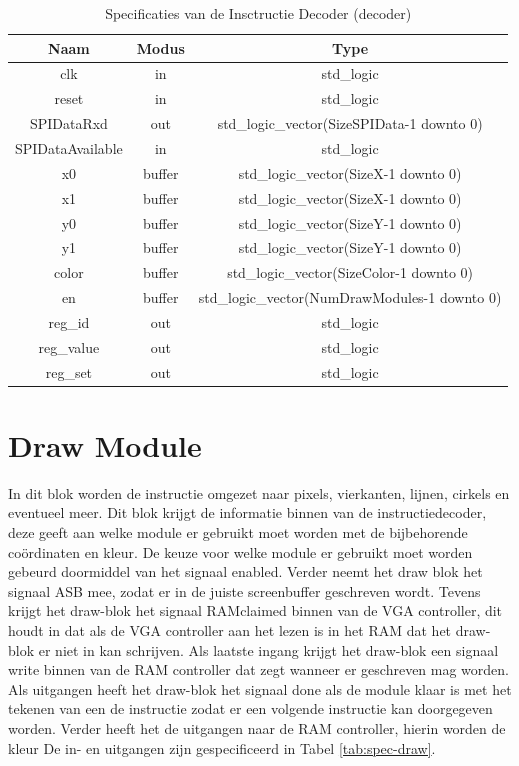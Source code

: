 \documentclass{scrreprt} %
\begin{document}
\begin{table}[H]
\centering
\caption{Specificaties van de Insctructie Decoder (decoder)}
\label{tab:spec-decoder}
\begin{tabular}{c c c}
	\hline\hline
 	Naam & Modus & Type\\
 	\hline
	clk & in & std\_logic \\
	reset & in & std\_logic \\	
	SPIDataRxd & out & std\_logic\_vector(SizeSPIData-1 downto 0) \\
	SPIDataAvailable & in & std\_logic \\
	x0 &  buffer & std\_logic\_vector(SizeX-1 downto 0) \\
	x1 &  buffer & std\_logic\_vector(SizeX-1 downto 0) \\
	y0 &  buffer & std\_logic\_vector(SizeY-1 downto 0) \\
	y1 &  buffer & std\_logic\_vector(SizeY-1 downto 0) \\
	color &  buffer & std\_logic\_vector(SizeColor-1 downto 0) \\
	en & buffer & std\_logic\_vector(NumDrawModules-1 downto 0)\\
	reg\_id & out & std\_logic \\
	reg\_value & out & std\_logic \\
	reg\_set & out & std\_logic \\
  	\hline
\end{tabular}
\end{table}

\section{Draw Module}
In dit blok worden de instructie omgezet naar pixels, vierkanten, lijnen, cirkels en eventueel meer. Dit blok krijgt de informatie binnen van de instructiedecoder, deze geeft aan welke module er gebruikt moet worden met de bijbehorende coördinaten en kleur.
De keuze voor welke module er gebruikt moet worden gebeurd doormiddel van het signaal enabled. Verder neemt het draw blok het signaal ASB mee, zodat er in de juiste screenbuffer geschreven wordt.
Tevens krijgt het draw-blok het signaal RAMclaimed binnen van de VGA controller, dit houdt in dat als de VGA controller aan het lezen is in het RAM dat het draw-blok er niet in kan schrijven.
Als laatste ingang krijgt het draw-blok een signaal write binnen van de RAM controller dat zegt wanneer er geschreven mag worden.
Als uitgangen heeft het draw-blok het signaal done als de module klaar is met het tekenen van een de instructie zodat er een volgende instructie kan doorgegeven worden. Verder heeft het de uitgangen naar de RAM controller, hierin worden de kleur 
De in- en uitgangen zijn gespecificeerd in Tabel \ref{tab:spec-draw}.
\end{document}

